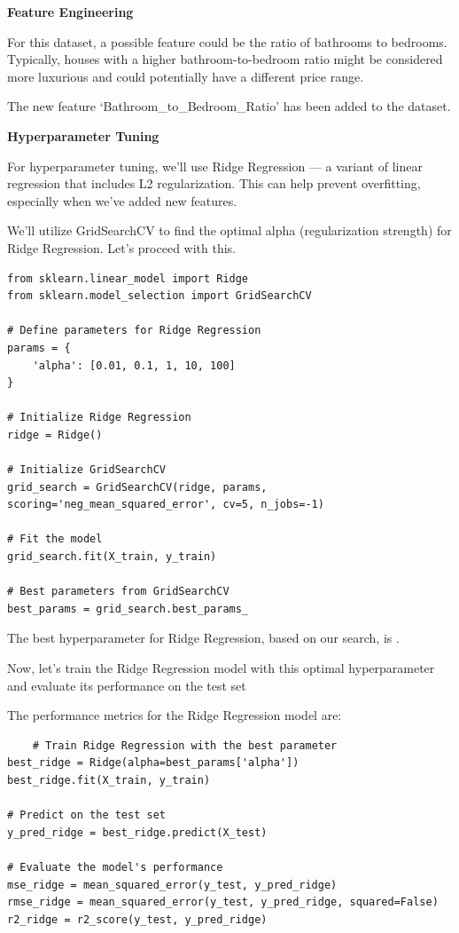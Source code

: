 \documentclass[]{article}
\begin{document}
\textbf{Feature Engineering}

For this dataset, a possible feature could be the ratio of bathrooms to
bedrooms. Typically, houses with a higher bathroom-to-bedroom ratio
might be considered more luxurious and could potentially have a
different price range.

The new feature `Bathroom\_to\_Bedroom\_Ratio' has been added to the
dataset.

\textbf{Hyperparameter Tuning}

For hyperparameter tuning, we'll use Ridge Regression --- a variant of
linear regression that includes L2 regularization. This can help prevent
overfitting, especially when we've added new features.

We'll utilize GridSearchCV to find the optimal alpha (regularization
strength) for Ridge Regression. Let's proceed with this.
\begin{verbatim}
from sklearn.linear_model import Ridge
from sklearn.model_selection import GridSearchCV

# Define parameters for Ridge Regression
params = {
    'alpha': [0.01, 0.1, 1, 10, 100]
}

# Initialize Ridge Regression
ridge = Ridge()

# Initialize GridSearchCV
grid_search = GridSearchCV(ridge, params, scoring='neg_mean_squared_error', cv=5, n_jobs=-1)

# Fit the model
grid_search.fit(X_train, y_train)

# Best parameters from GridSearchCV
best_params = grid_search.best_params_
\end{verbatim}

The best hyperparameter for Ridge Regression, based on our search, is .

Now, let’s train the Ridge Regression model with this optimal hyperparameter and evaluate its performance on the test set

The performance metrics for the Ridge Regression model are:
\begin{verbatim}
    # Train Ridge Regression with the best parameter
best_ridge = Ridge(alpha=best_params['alpha'])
best_ridge.fit(X_train, y_train)

# Predict on the test set
y_pred_ridge = best_ridge.predict(X_test)

# Evaluate the model's performance
mse_ridge = mean_squared_error(y_test, y_pred_ridge)
rmse_ridge = mean_squared_error(y_test, y_pred_ridge, squared=False)
r2_ridge = r2_score(y_test, y_pred_ridge)
\end{verbatim}
\end{document}
